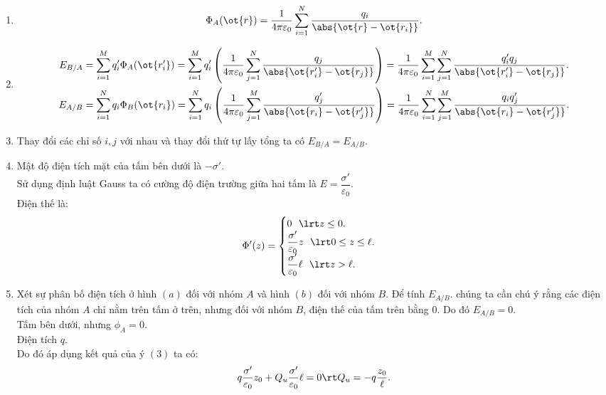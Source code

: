 \begin{loigiai}
\begin{enumerate}[1)]
    \item
    \[\Phi_{A}(\ot{r})=\dfrac{1}{4\pi\varepsilon_0}\sum_{i=1}^{N}\dfrac{q_{i}}{\abs{\ot{r}-\ot{r_{i}}}}.\]
    \item
    \begin{align*}
        E_{B/A}&=\sum_{i=1}^{M}q'_{i}\Phi_{A}(\ot{r'_{i}})=\sum_{i=1}^{M}q'_{i}\left(\dfrac{1}{4\pi\varepsilon_0}\sum_{j=1}^{N}\dfrac{q_{j}}{\abs{\ot{r'_{i}}-\ot{r_{j}}}}\right)=\dfrac{1}{4\pi\varepsilon_0}\sum_{i=1}^{M}\sum_{j=1}^{N}\dfrac{q'_{i}q_{j}}{\abs{\ot{r'_{i}}-\ot{r_{j}}}}.\\
        E_{A/B}&=\sum_{i=1}^{N}q_{i}\Phi_{B}(\ot{r_{i}})=\sum_{i=1}^{N}q_{i}\left(\dfrac{1}{4\pi\varepsilon_0}\sum_{j=1}^{M}\dfrac{q'_{j}}{\abs{\ot{r_{i}}-\ot{r'_{j}}}}\right)=\dfrac{1}{4\pi\varepsilon_0}\sum_{i=1}^{N}\sum_{j=1}^{M}\dfrac{q_{i}q'_{j}}{\abs{\ot{r_{i}}-\ot{r'_{j}}}}.
    \end{align*}
    \item Thay đổi các chỉ số $i, j$ với nhau và thay đổi thứ tự lấy tổng ta có $E_{B/A}=E_{A/B}$.
    \item Mật độ điện tích mặt của tấm bên dưới là $-\sigma'$.\\
    Sử dụng định luật Gauss ta có cường độ điện trường giữa hai tấm là $E=\dfrac{\sigma'}{\varepsilon_0}$.\\
    Điện thế là:
    \[\Phi'(z)=
    \begin{cases}
    0~~\lrt z\leq 0.\\
    \dfrac{\sigma'}{\varepsilon_0}z~~\lrt 0\leq z \leq \ell.\\
    \dfrac{\sigma'}{\varepsilon_0}\ell~~ \lrt z>\ell.
    \end{cases}\]
    \item Xét sự phân bố điện tích ở hình $(a)$ đối với nhóm $A$ và hình $(b)$ đối với nhóm $B$. Để tính $E_{A/B}$. chúng ta cần chú ý rằng các điện tích của nhóm $A$ chỉ nằm trên tấm ở trên, nhưng đối với nhóm $B$, điện thế của tấm trên bằng $0$. Do đó $E_{A/B}=0$.\\
    Tấm bên dưới, nhưng $\phi_{A}=0$.\\
    Điện tích $q$.\\
    Do đó áp dụng kết quả của ý $(3)$ ta có:
    \[q\dfrac{\sigma'}{\varepsilon_0}z_0+Q_{u}\dfrac{\sigma'}{\varepsilon_0}\ell=0\rt Q_{u}=-q\dfrac{z_0}{\ell}.\]
\end{enumerate}
\end{loigiai}

